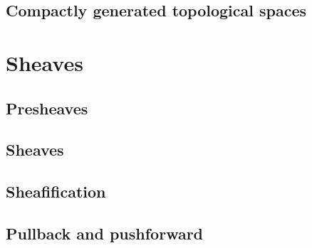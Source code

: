 \documentclass[a4paper,nobib,nols]{tufte-book}
\begin{document}
\section{Compactly generated topological spaces}%
\label{sec:compactly_generated_topological_spaces}

\chapter{Sheaves}%
\label{cha:sheaves}

\section{Presheaves}%
\label{sec:presheaves}

\section{Sheaves}%
\label{sec:sheaves}

\section{Sheafification}%
\label{sec:sheafification}

\section{Pullback and pushforward}%
\label{sec:pullback_and_pushforward}

\end{document}

